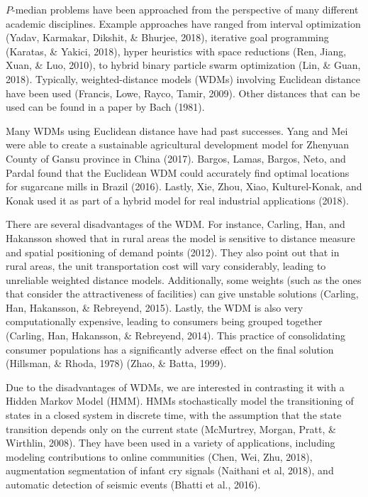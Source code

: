 \documentclass[twoside,twocolumn]{article}
\begin{document}
$P$-median problems have been approached from the perspective of many different academic disciplines.
Example approaches have ranged from interval optimization (Yadav, Karmakar, Dikshit, \& Bhurjee, 2018), iterative goal programming (Karatas, \& Yakici, 2018), hyper heuristics with space reductions (Ren, Jiang, Xuan, \& Luo, 2010), to hybrid binary particle swarm optimization (Lin, \& Guan, 2018).
Typically, weighted-distance models (WDMs) involving Euclidean distance have been used (Francis, Lowe, Rayco, Tamir, 2009).
Other distances that can be used can be found in a paper by Bach (1981).

Many WDMs using Euclidean distance have had past successes.
Yang and Mei were able to create a sustainable agricultural development model for Zhenyuan County of Gansu province in China (2017).
Bargos, Lamas, Bargos, Neto, and Pardal found that the Euclidean WDM could accurately find optimal locations for sugarcane mills in Brazil (2016).
Lastly, Xie, Zhou, Xiao, Kulturel-Konak, and Konak used it as part of a hybrid model for real industrial applications (2018).

There are several disadvantages of the WDM.
For instance, Carling, Han, and Hakansson showed that in rural areas the model is sensitive to distance measure and spatial positioning of demand points (2012).
They also point out that in rural areas, the unit transportation cost will vary considerably, leading to unreliable weighted distance models.
Additionally, some weights (such as the ones that consider the attractiveness of facilities) can give unstable solutions (Carling, Han, Hakansson, \& Rebreyend, 2015).
Lastly, the WDM is also very computationally expensive, leading to consumers being grouped together (Carling, Han, Hakansson, 
\& Rebreyend, 2014). 
This practice of consolidating consumer populations has a significantly adverse effect on the final solution (Hillsman, \& Rhoda, 1978) (Zhao, \& Batta, 1999).

Due to the disadvantages of WDMs, we are interested in contrasting it with a Hidden Markov Model (HMM).
HMMs stochastically model the transitioning of states in a closed system in discrete time, with the assumption that the state transition depends only on the current state (McMurtrey, Morgan, Pratt, \& Wirthlin, 2008).
They have been used in a variety of applications, including modeling contributions to online communities (Chen, Wei, Zhu, 2018), augmentation segmentation of infant cry signals (Naithani et al, 2018), and automatic detection of seismic events (Bhatti et al., 2016).
\end{document}
